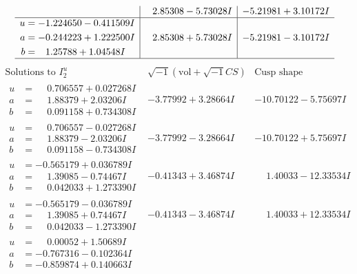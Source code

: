 \documentclass[1p]{elsarticle_modified}
\theoremstyle{definition}
\newcommand{\I}{\sqrt{-1}}
\begin{document}
$$\begin{array}{c|c|c}
 & \phantom{-}2.85308 - 5.73028 I & -5.21981 + 3.10172 I \\ \hline\begin{aligned}
u &= -1.224650 - 0.411509 I \\
a &= -0.244223 + 1.222500 I \\
b &= \phantom{-}1.25788 + 1.04548 I\end{aligned}
 & \phantom{-}2.85308 + 5.73028 I & -5.21981 - 3.10172 I\\
 \hline 
 \end{array}$$\newpage$$\begin{array}{c|c|c}  
\text{Solutions to }I^u_{2}& \I (\text{vol} + \sqrt{-1}CS) & \text{Cusp shape}\\
 \hline 
\begin{aligned}
u &= \phantom{-}0.706557 + 0.027268 I \\
a &= \phantom{-}1.88379 + 2.03206 I \\
b &= \phantom{-}0.091158 + 0.734308 I\end{aligned}
 & -3.77992 + 3.28664 I & -10.70122 - 5.75697 I \\ \hline\begin{aligned}
u &= \phantom{-}0.706557 - 0.027268 I \\
a &= \phantom{-}1.88379 - 2.03206 I \\
b &= \phantom{-}0.091158 - 0.734308 I\end{aligned}
 & -3.77992 - 3.28664 I & -10.70122 + 5.75697 I \\ \hline\begin{aligned}
u &= -0.565179 + 0.036789 I \\
a &= \phantom{-}1.39085 - 0.74467 I \\
b &= \phantom{-}0.042033 + 1.273390 I\end{aligned}
 & -0.41343 + 3.46874 I & \phantom{-}1.40033 - 12.33534 I \\ \hline\begin{aligned}
u &= -0.565179 - 0.036789 I \\
a &= \phantom{-}1.39085 + 0.74467 I \\
b &= \phantom{-}0.042033 - 1.273390 I\end{aligned}
 & -0.41343 - 3.46874 I & \phantom{-}1.40033 + 12.33534 I \\ \hline\begin{aligned}
u &= \phantom{-}0.00052 + 1.50689 I \\
a &= -0.767316 - 0.102364 I \\
b &= -0.859874 + 0.140663 I\end{aligned}

\end{array}$$
\end{document}
